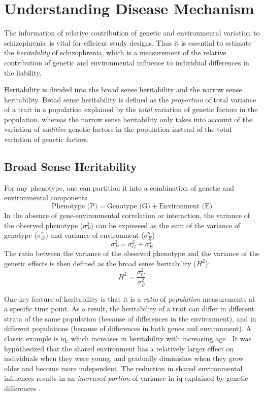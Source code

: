 \documentclass[12pt]{scrbook}
\newcommand*{\scz}{schizophrenia}
\begin{document}
\section{Understanding Disease Mechanism}
The information of relative contribution of genetic and environmental variation to \scz\ is vital for efficient study designs.
Thus it is essential to estimate the \emph{heritability} of \scz, which is a measurement of the relative contribution of genetic and environmental influence to individual differences in the liability.

Heritability is divided into the broad sense heritability and the narrow sense heritability.
Broad sense heritability is defined as the \emph{proportion} of total variance of a trait in a population explained by the \emph{total} variation of genetic factors in the population, whereas the narrow sense heritability only takes into account of the variation of \emph{additive} genetic factors in the population instead of the total variation of genetic factors.

\subsection{Broad Sense Heritability}
For any phenotype, one can partition it into a combination of genetic and environmental components \citep{falconer1996introduction}
$$
\text{Phenotype (P)}=\text{Genotype (G)}+\text{Environment (E)}
$$
In the absence of gene-environmental correlation or interaction, the variance of the observed phenotype ($\sigma_P^2$) can be expressed as the sum of the variance of genotype ($\sigma_G^2$) and variance of environment ($\sigma_E^2$)
$$
\sigma_P^2=\sigma_G^2+\sigma_E^2
$$
The ratio between the variance of the observed phenotype and the variance of the genetic effects is then defined as the broad sense heritability ($H^2$):
$$
H^2=\frac{\sigma_G^2}{\sigma_P^2}
$$

One key feature of heritability is that it is a \emph{ratio} of \emph{population} measurements at a specific time point.
As a result, the heritability of a trait can differ in different strata of the same population (because of differences in the environment), and in different populations (because of differences in both genes and environment).
A classic example is \gls{iq}, which increases in heritability with increasing age \citep{Bouchard2013}.
It was hypothesized that the shared environment has a relatively larger effect on individuals when they were young, and gradually diminishes when they grow older and become more independent.
The reduction in shared environmental influences results in an \emph{increased portion} of variance in \gls{iq} explained by genetic differences \citep{Bouchard2013}. 
\end{document}
